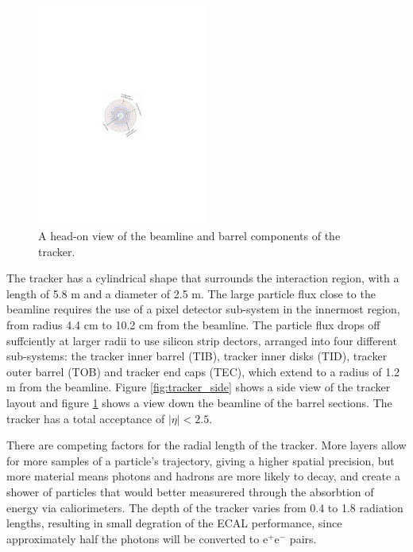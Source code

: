 \begin{figure}[h]
   \centering
  \includegraphics[width=0.5\textwidth]{Figures/CMS_Diagrams/Tracker__Barrel_View.pdf}
  \caption{A head-on view of the beamline and barrel components of the
  tracker.} \label{fig:tracker_barrel}
\end{figure}

\par The tracker has a cylindrical shape that surrounds the interaction 
region, with a length of 5.8 m and a diameter of 2.5 m.  The large
particle flux close to the beamline requires the use of a pixel
detector sub-system in the innermost region, from radius 4.4 cm to
10.2 cm from the beamline.  The particle flux drops off suffciently at
larger radii to use silicon strip dectors, arranged into four
different sub-systems: the tracker inner barrel (TIB), tracker inner
disks (TID), tracker outer barrel (TOB) and tracker end caps (TEC),
which extend to a radius of 1.2 m from the beamline.  Figure
\ref{fig:tracker_side} shows a side view of the tracker layout and
figure \ref{fig:tracker_barrel} shows a view down the beamline of the
barrel sections.  The tracker has a total acceptance of $|\eta|<2.5$.  

\par There are competing factors for the radial length of the
tracker.  More layers allow for more samples of a particle's
trajectory, giving a higher spatial precision, but more material means
photons and hadrons are more likely to decay, and create a shower of
particles that would better measurered through the absorbtion of
energy via caliorimeters. The depth of the tracker varies from 0.4 to
1.8 radiation lengths, resulting in small degration of the ECAL
performance, since approximately half the photons will be converted to
e$^{+}$e$^{-}$ pairs.   


